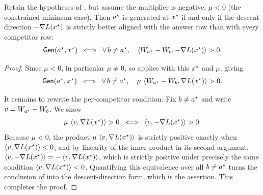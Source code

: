 \begin{corollary}
\label{cor:neg}
Retain the hypotheses of , but assume the multiplier is negative, $\mu < 0$
(the constrained-minimum case). Then $a^{\star}$ is generated at $x^{\star}$ if and only if the
descent direction $-\nabla L(x^{\star})$ is strictly better aligned with the answer row than
with every competitor row:
\begin{align*}
\mathsf{Gen}(a^{\star}, x^{\star})
\;\iff\;
\forall\, b \ne a^{\star},\quad \left\langle W_{a^{\star}} - W_{b}, -\nabla L(x^{\star}) \right\rangle > 0.
\end{align*}
\end{corollary}

\begin{proof}
Since $\mu < 0$, in particular $\mu \ne 0$, so  applies with this $x^{\star}$ and
$\mu$, giving
\begin{align*}
\mathsf{Gen}(a^{\star}, x^{\star})
\;\iff\;
\forall\, b \ne a^{\star},\quad \mu\,\left\langle W_{a^{\star}} - W_{b}, \nabla L(x^{\star}) \right\rangle > 0.
\end{align*}

It remains to rewrite the per-competitor condition. Fix $b \ne a^{\star}$ and write
$v = W_{a^{\star}} - W_{b}$. We show
\begin{align*}
\mu\,\left\langle v, \nabla L(x^{\star}) \right\rangle > 0
\;\iff\;
\left\langle v, -\nabla L(x^{\star}) \right\rangle > 0.
\end{align*}
Because $\mu < 0$, the product $\mu\,\left\langle v, \nabla L(x^{\star}) \right\rangle$ is strictly positive
exactly when $\left\langle v, \nabla L(x^{\star}) \right\rangle < 0$; and by linearity of the inner product in its
second argument, $\left\langle v, -\nabla L(x^{\star}) \right\rangle = -\left\langle v, \nabla L(x^{\star}) \right\rangle$, which is
strictly positive under precisely the same condition $\left\langle v, \nabla L(x^{\star}) \right\rangle < 0$.
Quantifying this equivalence over all $b \ne a^{\star}$ turns the conclusion of 
into the descent-direction form, which is the assertion. This completes the proof.
\end{proof}
